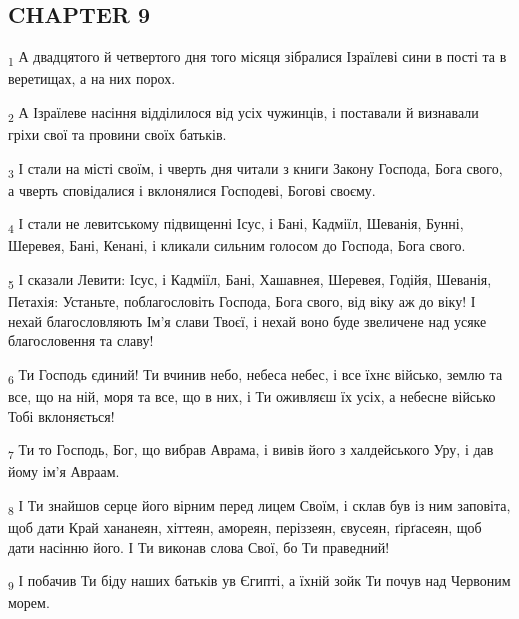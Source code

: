 \subsection{CHAPTER 9}
\begin{tcolorbox}
\textsubscript{1} А двадцятого й четвертого дня того місяця зібралися Ізраїлеві сини в пості та в веретищах, а на них порох.
\end{tcolorbox}
\begin{tcolorbox}
\textsubscript{2} А Ізраїлеве насіння відділилося від усіх чужинців, і поставали й визнавали гріхи свої та провини своїх батьків.
\end{tcolorbox}
\begin{tcolorbox}
\textsubscript{3} І стали на місті своїм, і чверть дня читали з книги Закону Господа, Бога свого, а чверть сповідалися і вклонялися Господеві, Богові своєму.
\end{tcolorbox}
\begin{tcolorbox}
\textsubscript{4} І стали не левитському підвищенні Ісус, і Бані, Кадміїл, Шеванія, Бунні, Шеревея, Бані, Кенані, і кликали сильним голосом до Господа, Бога свого.
\end{tcolorbox}
\begin{tcolorbox}
\textsubscript{5} І сказали Левити: Ісус, і Кадміїл, Бані, Хашавнея, Шеревея, Годійя, Шеванія, Петахія: Устаньте, поблагословіть Господа, Бога свого, від віку аж до віку! І нехай благословляють Ім'я слави Твоєї, і нехай воно буде звеличене над усяке благословення та славу!
\end{tcolorbox}
\begin{tcolorbox}
\textsubscript{6} Ти Господь єдиний! Ти вчинив небо, небеса небес, і все їхнє військо, землю та все, що на ній, моря та все, що в них, і Ти оживляєш їх усіх, а небесне військо Тобі вклоняється!
\end{tcolorbox}
\begin{tcolorbox}
\textsubscript{7} Ти то Господь, Бог, що вибрав Аврама, і вивів його з халдейського Уру, і дав йому ім'я Авраам.
\end{tcolorbox}
\begin{tcolorbox}
\textsubscript{8} І Ти знайшов серце його вірним перед лицем Своїм, і склав був із ним заповіта, щоб дати Край хананеян, хіттеян, амореян, періззеян, євусеян, ґірґасеян, щоб дати насінню його. І Ти виконав слова Свої, бо Ти праведний!
\end{tcolorbox}
\begin{tcolorbox}
\textsubscript{9} І побачив Ти біду наших батьків ув Єгипті, а їхній зойк Ти почув над Червоним морем.
\end{tcolorbox}
